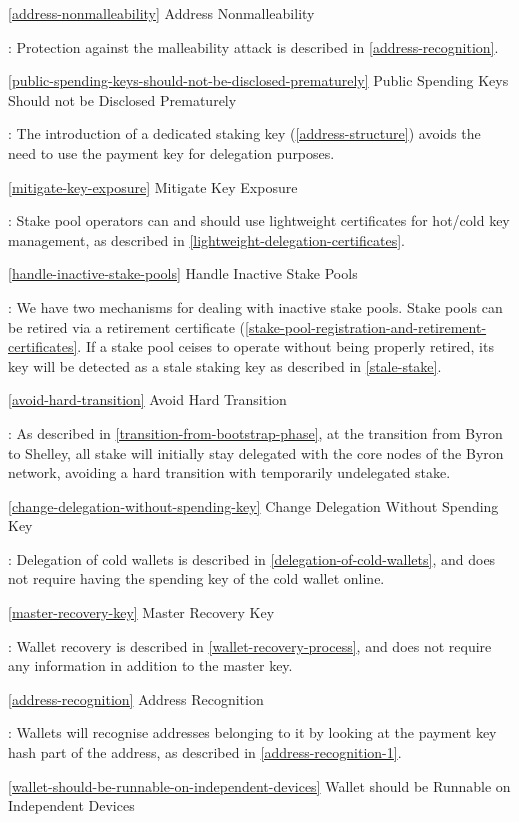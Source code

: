 \documentclass[11pt,a4paper]{article}
\begin{document}
\ref{address-nonmalleability} Address Nonmalleability

: Protection against the malleability attack is described in
\ref{address-recognition}.

\ref{public-spending-keys-should-not-be-disclosed-prematurely} Public
Spending Keys Should not be Disclosed Prematurely

: The introduction of a dedicated staking key (\ref{address-structure})
avoids the need to use the payment key for delegation purposes.

\ref{mitigate-key-exposure} Mitigate Key Exposure

: Stake pool operators can and should use lightweight certificates for
hot/cold key management, as described in
\ref{lightweight-delegation-certificates}.

\ref{handle-inactive-stake-pools} Handle Inactive Stake Pools

: We have two mechanisms for dealing with inactive stake pools. Stake
pools can be retired via a retirement certificate
(\ref{stake-pool-registration-and-retirement-certificates}. If a stake
pool ceises to operate without being properly retired, its key will be
detected as a stale staking key as described in \ref{stale-stake}.

\ref{avoid-hard-transition} Avoid Hard Transition

: As described in \ref{transition-from-bootstrap-phase}, at the
transition from Byron to Shelley, all stake will initially stay
delegated with the core nodes of the Byron network, avoiding a hard
transition with temporarily undelegated stake.

\ref{change-delegation-without-spending-key} Change Delegation Without
Spending Key

: Delegation of cold wallets is described in
\ref{delegation-of-cold-wallets}, and does not require having the
spending key of the cold wallet online.

\ref{master-recovery-key} Master Recovery Key

: Wallet recovery is described in \ref{wallet-recovery-process}, and
does not require any information in addition to the master key.

\ref{address-recognition} Address Recognition

: Wallets will recognise addresses belonging to it by looking at the
payment key hash part of the address, as described in
\ref{address-recognition-1}.

\ref{wallet-should-be-runnable-on-independent-devices} Wallet should be
Runnable on Independent Devices
\end{document}
